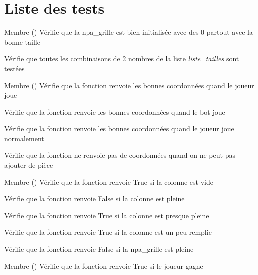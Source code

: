 \chapter{Liste des tests}
\hypertarget{test}{}\label{test}

\begin{DoxyRefList}
\item[Membre \doxylink{namespacetests_1_1test__grid_ad82b63eca2aba44c5309b7597c28ce74}{tests.test\+\_\+grid.tg\+\_\+init\+\_\+grille} ()]\label{test__test000001}%
%
Vérifie que la npa\+\_\+grille est bien initialisée avec des 0 partout avec la bonne taille 



Vérifie que toutes les combinaisons de 2 nombres de la liste {\itshape liste\+\_\+tailles} sont testées  
\item[Membre \doxylink{namespacetests_1_1test__puissanceQuatre_abb0f25f21e66d41cbed7dafb21ef453e}{tests.test\+\_\+puissance\+Quatre.tp\+\_\+ajout\+\_\+piece} ()]\label{test__test000003}%
%
Vérifie que la fonction renvoie les bonnes coordonnées quand le joueur joue 



Vérifie que la fonction renvoie les bonnes coordonnées quand le bot joue 



Vérifie que la fonction renvoie les bonnes coordonnées quand le joueur joue normalement 



Vérifie que la fonction ne renvoie pas de coordonnées quand on ne peut pas ajouter de pièce  
\item[Membre \doxylink{namespacetests_1_1test__puissanceQuatre_adb8d3adbab201a138b984cc5e3fc0162}{tests.test\+\_\+puissance\+Quatre.tp\+\_\+verif\+\_\+colonne} ()]\label{test__test000002}%
%
Vérifie que la fonction renvoie True si la colonne est vide 



Vérifie que la fonction renvoie False si la colonne est pleine 



Vérifie que la fonction renvoie True si la colonne est presque pleine 



Vérifie que la fonction renvoie True si la colonne est un peu remplie 



Vérifie que la fonction renvoie False si la npa\+\_\+grille est pleine  
\item[Membre \doxylink{namespacetests_1_1test__puissanceQuatre_afc12dead8e5f0b8925962770fbf86dc7}{tests.test\+\_\+puissance\+Quatre.tp\+\_\+victoire\+\_\+colonne} ()]\label{test__test000005}%
%
Vérifie que la fonction renvoie True si le joueur gagne 




\end{DoxyRefList}
